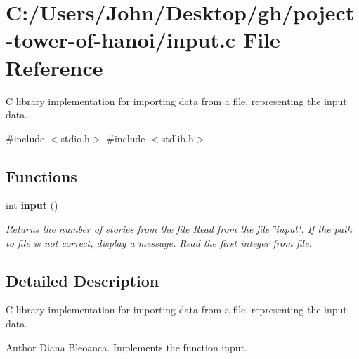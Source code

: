 \section{C\+:/\+Users/\+John/\+Desktop/gh/poject-\/tower-\/of-\/hanoi/input.c File Reference}
\label{input_8c}


C library implementation for importing data from a file, representing the input data.  


{\ttfamily \#include $<$stdio.\+h$>$}\newline
{\ttfamily \#include $<$stdlib.\+h$>$}\newline
\subsection*{Functions}
\begin{DoxyCompactItemize}
\item 
\mbox{\label{input_8c_ac3bdbc826d19fb41ffb25470527c3801}} 
int \textbf{ input} ()
\begin{DoxyCompactList}\small\item\em Returns the number of stories from the file Read from the file \char`\"{}input\char`\"{}. If the path to file is not correct, display a message. Read the first integer from file. \end{DoxyCompactList}\end{DoxyCompactItemize}


\subsection{Detailed Description}
C library implementation for importing data from a file, representing the input data. 

\begin{DoxyAuthor}{Author}
Diana Bleoanca. Implements the function input. 
\end{DoxyAuthor}
